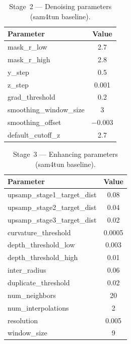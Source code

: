 \begin{table}[ht]
\caption{Stage~2 --- Denoising parameters (sam4tun baseline).}\label{tab:denoise-params}
\begin{tabular*}{\tblwidth}{@{} l c @{}}
\toprule
Parameter & Value \\
\midrule
mask\_r\_low & 2.7 \\
mask\_r\_high & 2.8 \\
y\_step & 0.5 \\
z\_step & 0.001 \\
grad\_threshold & 0.2 \\
smoothing\_window\_size & 3 \\
smoothing\_offset & $-0.003$ \\
default\_cutoff\_z & 2.7 \\
\bottomrule
\end{tabular*}
\end{table}

\begin{table}[ht]
\caption{Stage~3 --- Enhancing parameters (sam4tun baseline).}\label{tab:enhance-params}
\begin{tabular*}{\tblwidth}{@{} l c @{}}
\toprule
Parameter & Value \\
\midrule
upsamp\_stage1\_target\_dist & 0.08 \\
upsamp\_stage2\_target\_dist & 0.04 \\
upsamp\_stage3\_target\_dist & 0.02 \\
curvature\_threshold & 0.0005 \\
depth\_threshold\_low & 0.003 \\
depth\_threshold\_high & 0.01 \\
inter\_radius & 0.06 \\
duplicate\_threshold & 0.02 \\
num\_neighbors & 20 \\
num\_interpolations & 2 \\
resolution & 0.005 \\
window\_size & 9 \\
\bottomrule
\end{tabular*}
\end{table}

